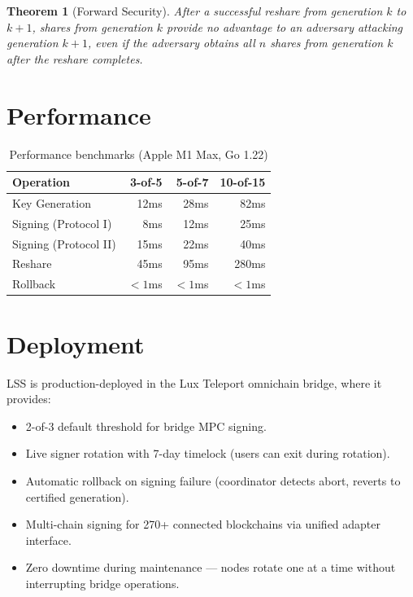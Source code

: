 \documentclass[11pt]{article}
\newtheorem{theorem}{Theorem}
\begin{document}
\begin{theorem}[Forward Security]
After a successful reshare from generation $k$ to $k+1$, shares from generation $k$ provide no advantage to an adversary attacking generation $k+1$, even if the adversary obtains all $n$ shares from generation $k$ after the reshare completes.
\end{theorem}

\section{Performance}

\begin{table}[h]
\centering
\small
\begin{tabular}{lrrr}
\toprule
\textbf{Operation} & \textbf{3-of-5} & \textbf{5-of-7} & \textbf{10-of-15} \\
\midrule
Key Generation & 12ms & 28ms & 82ms \\
Signing (Protocol I) & 8ms & 12ms & 25ms \\
Signing (Protocol II) & 15ms & 22ms & 40ms \\
Reshare & 45ms & 95ms & 280ms \\
Rollback & $< 1$ms & $< 1$ms & $< 1$ms \\
\bottomrule
\end{tabular}
\caption{Performance benchmarks (Apple M1 Max, Go 1.22)}
\label{tab:perf}
\end{table}

\section{Deployment}

LSS is production-deployed in the Lux Teleport omnichain bridge, where it provides:

\begin{itemize}[nosep]
  \item 2-of-3 default threshold for bridge MPC signing.
  \item Live signer rotation with 7-day timelock (users can exit during rotation).
  \item Automatic rollback on signing failure (coordinator detects abort, reverts to certified generation).
  \item Multi-chain signing for 270+ connected blockchains via unified adapter interface.
  \item Zero downtime during maintenance --- nodes rotate one at a time without interrupting bridge operations.
\end{itemize}
\end{document}
